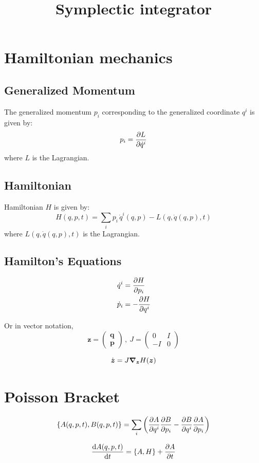 \documentclass{article}
\title{Symplectic integrator}
\author{}
\date{}
\renewcommand{\vec}[1]{\boldsymbol{#1}}
\begin{document}
\maketitle

\section{Hamiltonian mechanics}

\subsection{Generalized Momentum}
The generalized momentum $p_i$ corresponding to the generalized coordinate $q^i$ is given by:
\[ p_i = \pdv{L}{\dot{q}^i} \]
where $L$ is the Lagrangian.

\subsection{Hamiltonian}
Hamiltonian $H$ is given by:
\[ H(q,p,t) = \sum_i p_i \, \dot{q}^i(q,p) - L(q,\dot{q}(q,p),t) \]
where $L(q,\dot{q}(q,p),t)$ is the Lagrangian.

\subsection{Hamilton's Equations}
\begin{align*}
	\dot{q}^i &= \pdv{H}{p_i} \\
	\dot{p}_i &= -\pdv{H}{q^i}
\end{align*}

Or in vector notation,
\[ \vec{z} = 
\begin{pmatrix}
	\vec{q} \\
	\vec{p}	
\end{pmatrix} \, , \
J = 
\begin{pmatrix}
	0 & I \\
	-I & 0
\end{pmatrix} \]

\[ \dot{\vec{z}} = J \grad_{\vec{z}}{H(\vec{z})} \]

\section{Poisson Bracket}

\[ \{ A(q,p,t) , B(q,p,t) \} = \sum_i \left( \pdv{A}{q^i} \pdv{B}{p_i} - \pdv{B}{q^i} \pdv{A}{p_i} \right) \]

\[ \dv{A(q,p,t)}{t} = \{ A,H \} + \pdv{A}{t} \]
\end{document}
